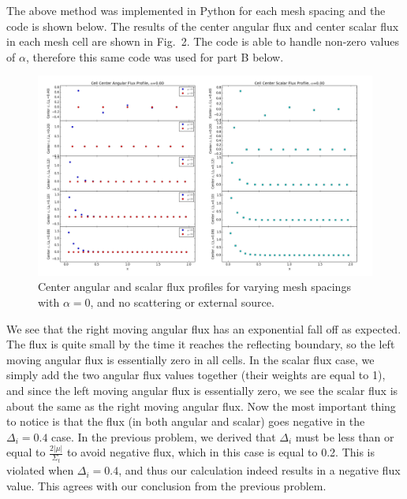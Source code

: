 \documentclass[10pt]{article}
\begin{document}
The above method was implemented in Python for each mesh spacing and the code is shown below. The results of the center angular flux and center scalar flux in each mesh cell are shown in Fig.~2. The code is able to handle non-zero values of $\alpha$, therefore this same code was used for part B below. \\



\begin{figure}[H]
    \centering
    \includegraphics[width=\textwidth]{Figures/FluxProfile_a=0}
    \caption{Center angular and scalar flux profiles for varying mesh spacings with $\alpha = 0$, and no scattering or external source.}
    \label{fig2}
\end{figure}

We see that the right moving angular flux has an exponential fall off as expected. The flux is quite small by the time it reaches the reflecting boundary, so the left moving angular flux is essentially zero in all cells. In the scalar flux case, we simply add the two angular flux values together (their weights are equal to 1), and since the left moving angular flux is essentially zero, we see the scalar flux is about the same as the right moving angular flux. Now the most important thing to notice is that the flux (in both angular and scalar) goes negative in the $\Delta_i = 0.4$ case. In the previous problem, we derived that $\Delta_i$ must be less than or equal to $\frac{2|\mu|}{\Sigma_t}$ to avoid negative flux, which in this case is equal to 0.2. This is violated  when $\Delta_i = 0.4$, and thus our calculation indeed results in a negative flux value. This agrees with our conclusion from the previous problem.

%
%
%
\end{document}
